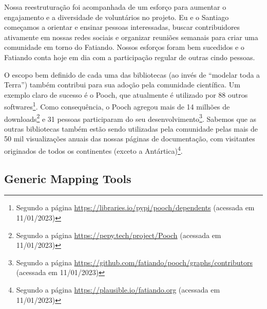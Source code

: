 \documentclass[10pt,a4paper,oneside]{book}
\begin{document}
Nossa reestruturação foi acompanhada de um esforço para aumentar o engajamento
e a diversidade de voluntários no projeto.
Eu e o Santiago começamos a orientar e ensinar pessoas interessadas, buscar
contribuidores ativamente em nossas redes sociais e organizar reuniões semanais
para criar uma comunidade em torno do Fatiando.
Nossos esforços foram bem sucedidos e o Fatiando conta hoje em dia com a
participação regular de outras cindo pessoas.

O escopo bem definido de cada uma das bibliotecas (ao invés de ``modelar
toda a Terra'') também contribui para sua adoção pela comunidade científica.
Um exemplo claro de sucesso é o Pooch, que atualmente é utilizado por 88 outros
softwares\footnote{Segundo a página
\url{https://libraries.io/pypi/pooch/dependents} (acessada em 11/01/2023)}.
Como consequência, o Pooch agregou mais de 14 milhões de downloads\footnote{Segundo a página
\url{https://pepy.tech/project/Pooch} (acessada em 11/01/2023)} e 31 pessoas
participaram do seu desenvolvimento\footnote{Segundo a página
\url{https://github.com/fatiando/pooch/graphs/contributors} (acessada em
11/01/2023)}.
Sabemos que as outras bibliotecas também estão sendo utilizadas pela comunidade
pelas mais de 50 mil visualizações anuais das nossas páginas de documentação,
com visitantes originados de todos os continentes (exceto a Antártica)\footnote{Segundo a página
\url{https://plausible.io/fatiando.org} (acessada em 11/01/2023)}.



\subsection{Generic Mapping Tools}
\label{sec_gmt}
\end{document}
